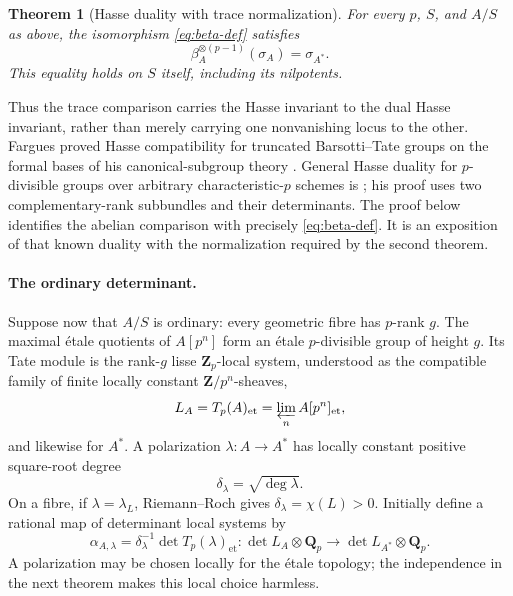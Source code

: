 \documentclass[11pt]{article}
\newtheorem{theorem}{Theorem}[section]
\theoremstyle{definition}\newtheorem{definition}[theorem]{Definition}
\theoremstyle{remark}\newtheorem{remark}[theorem]{Remark}
\newcommand{\ZZ}{\mathbf Z}
\newcommand{\QQ}{\mathbf Q}
\newcommand{\et}{\mathrm{et}}
\begin{document}
\begin{theorem}[Hasse duality with trace normalization]\label{thm:H}
For every $p$, $S$, and $A/S$ as above, the isomorphism \eqref{eq:beta-def} satisfies
\begin{equation}\label{eq:H}
 \beta_A^{\otimes(p-1)}(\sigma_A)=\sigma_{A^*}.
\end{equation}
This equality holds on $S$ itself, including its nilpotents.
\end{theorem}

Thus the trace comparison carries the Hasse invariant to the dual Hasse invariant, rather than merely carrying one nonvanishing locus to the other. Fargues proved Hasse compatibility for truncated Barsotti--Tate groups on the formal bases of his canonical-subgroup theory \citep[Proposition~2 and proof, author manuscript pp.~8--10]{Fargues}. General Hasse duality for $p$-divisible groups over arbitrary characteristic-$p$ schemes is \citet[Theorem~2.1.4, author manuscript pp.~11--12]{Bijakowski}; his proof uses two complementary-rank subbundles and their determinants. The proof below identifies the abelian comparison with precisely \eqref{eq:beta-def}. It is an exposition of that known duality with the normalization required by the second theorem.

\paragraph{The ordinary determinant.}
Suppose now that $A/S$ is ordinary: every geometric fibre has $p$-rank $g$. The maximal \'etale quotients of $A[p^n]$ form an \'etale $p$-divisible group of height $g$. Its Tate module is the rank-$g$ lisse $\ZZ_p$-local system, understood as the compatible family of finite locally constant $\ZZ/p^n$-sheaves,
\[
 L_A=T_p(A)_{\et}=\varprojlim_n A[p^n]_{\et},
\]
and likewise for $A^*$. A polarization $\lambda:A\to A^*$ has locally constant positive square-root degree
\[
 \delta_\lambda=\sqrt{\deg\lambda}.
\]
On a fibre, if $\lambda=\lambda_L$, Riemann--Roch gives $\delta_\lambda=\chi(L)>0$. Initially define a rational map of determinant local systems by
\begin{equation}\label{eq:alpha-rational}
 \alpha_{A,\lambda}
 =\delta_\lambda^{-1}\det T_p(\lambda)_{\et}:
 \det L_A\otimes\QQ_p\longrightarrow\det L_{A^*}\otimes\QQ_p.
\end{equation}
A polarization may be chosen locally for the \'etale topology; the independence in the next theorem makes this local choice harmless.
\end{document}
